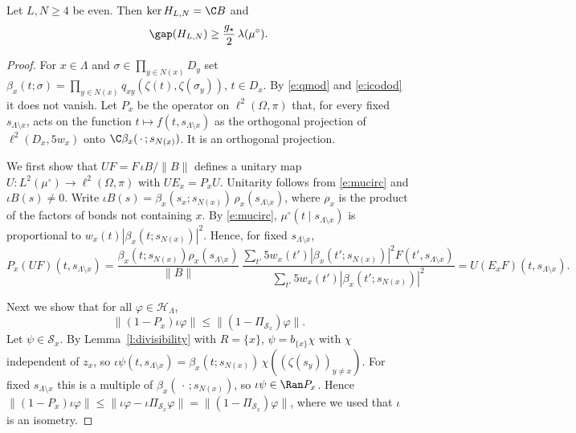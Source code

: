 \begin{theorem}\label{t:QD}
Let $L, N \ge 4$ be even. Then $\ker H_{L, N} = \C B$ and
\begin{equation*}
\gap(H_{L, N}) \ge \frac{g_\star}{2} \, \lambda(\mu^\circ) .
\end{equation*}
\end{theorem}

\begin{proof}
For $x \in \Lambda$ and $\sigma \in \prod_{y \in N(x)} D_y$ set $\beta_x(t; \sigma) = \prod_{y \in N(x)} q_{xy}(\zeta(t), \zeta(\sigma_y))$, $t \in D_x$. By \eqref{e:qmod} and \eqref{e:icodod} it does not vanish. Let $P_x$ be the operator on $\ell^2(\Omega, \pi)$ that, for every fixed $s_{\Lambda \setminus x}$, acts on the function $t \mapsto f(t, s_{\Lambda \setminus x})$ as the orthogonal projection of $\ell^2(D_x, 5 w_x)$ onto $\C \beta_x(\, \cdot \,; s_{N(x)})$. It is an orthogonal projection.

We first show that $U F = F \, \iota B / \|B\|$ defines a unitary map $U \colon L^2(\mu^\circ) \to \ell^2(\Omega, \pi)$ with $U E_x = P_x U$. Unitarity follows from \eqref{e:mucirc} and $\iota B(s) \neq 0$. Write $\iota B(s) = \beta_x(s_x; s_{N(x)}) \, \rho_x(s_{\Lambda \setminus x})$, where $\rho_x$ is the product of the factors of bonds not containing $x$. By \eqref{e:mucirc}, $\mu^\circ(t \mid s_{\Lambda \setminus x})$ is proportional to $w_x(t) |\beta_x(t; s_{N(x)})|^2$. Hence, for fixed $s_{\Lambda \setminus x}$,
\begin{equation*}
P_x (U F)(t, s_{\Lambda \setminus x}) = \frac{\beta_x(t; s_{N(x)}) \rho_x(s_{\Lambda \setminus x})}{\|B\|} \, \frac{\sum_{t'} 5 w_x(t') |\beta_x(t'; s_{N(x)})|^2 F(t', s_{\Lambda \setminus x})}{\sum_{t'} 5 w_x(t') |\beta_x(t'; s_{N(x)})|^2} = U(E_x F)(t, s_{\Lambda \setminus x}).
\end{equation*}

Next we show that for all $\varphi \in \mathcal H_\Lambda$,
\begin{equation}\label{e:QDcomp}
\|(1 - P_x) \iota \varphi\| \le \|(1 - \Pi_{\mathcal S_x}) \varphi\| .
\end{equation}
Let $\psi \in \mathcal S_x$. By Lemma~\ref{l:divisibility} with $R = \{x\}$, $\psi = b_{\{x\}} \chi$ with $\chi$ independent of $z_x$, so $\iota \psi(t, s_{\Lambda \setminus x}) = \beta_x(t; s_{N(x)}) \, \chi((\zeta(s_y))_{y \neq x})$. For fixed $s_{\Lambda \setminus x}$ this is a multiple of $\beta_x(\, \cdot \,; s_{N(x)})$, so $\iota \psi \in \Ran P_x$. Hence $\|(1 - P_x) \iota \varphi\| \le \|\iota \varphi - \iota \Pi_{\mathcal S_x} \varphi\| = \|(1 - \Pi_{\mathcal S_x}) \varphi\|$, where we used that $\iota$ is an isometry.


\end{proof}
